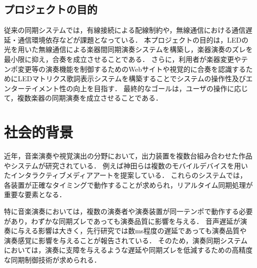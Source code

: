 \documentclass[lualatex,book,openany,paper=a4paper,jafontsize=11.5pt,jafontscale=1.05]{jlreq}
\begin{document}
\subsection{プロジェクトの目的}
従来の同期システムでは，有線接続による配線制約や，無線通信における通信遅延・通信環境依存などが課題となっている．
本プロジェクトの目的は，LEDの光を用いた無線通信による楽器間同期演奏システムを構築し，楽器演奏のズレを最小限に抑え，合奏を成立させることである．
さらに，利用者が楽器変更やテンポ変更等の演奏機能を制御するためのWebサイトや視覚的に合奏を認識するためにLEDマトリクス歌詞表示システムを構築することでシステムの操作性及びエンターテイメント性の向上を目指す．
最終的なゴールは，ユーザの操作に応じて，複数楽器の同期演奏を成立させることである．
\section{社会的背景}
近年，音楽演奏や視覚演出の分野において，出力装置を複数台組み合わせた作品やシステムが研究されている．
例えば神田らは複数のモバイルデバイスを用いたインタラクティブメディアアートを提案している\cite{組み合わせ}．
これらのシステムでは，各装置が正確なタイミングで動作することが求められ，リアルタイム同期処理が重要な要素となる．


特に音楽演奏においては，複数の演奏者や演奏装置が同一テンポで動作する必要があり，わずかな同期ズレであっても演奏品質に影響を与える．
音声遅延が演奏に与える影響は大きく，先行研究では数ms程度の遅延であっても演奏品質や演奏感覚に影響を与えることが報告されている\cite{遅延研究}．
そのため，演奏同期システムにおいては，演奏に支障を与えるような遅延や同期ズレを低減するための高精度な同期制御技術が求められる．
\end{document}
